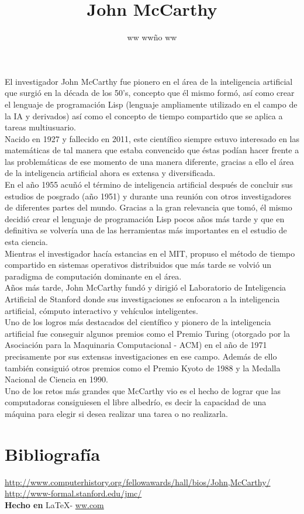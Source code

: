 \documentclass{article}
\title{John McCarthy}
\author{ww ww\~no ww}
\date{} %
\begin{document}
	\maketitle
	\normalsize{
El investigador John McCarthy fue pionero en el área de la inteligencia artificial que surgió en la década de los 50's, concepto que él mismo formó, así como crear el lenguaje de programación Lisp (lenguaje ampliamente utilizado en el campo de la IA y derivados) así como el concepto de tiempo compartido que se aplica a tareas multiusuario.
\\

Nacido en 1927 y fallecido en 2011, este científico siempre estuvo interesado en las matemáticas de tal manera que estaba convencido que éstas podían hacer frente a las problemáticas de ese momento de una manera diferente, gracias a ello el área de la inteligencia artificial ahora es extensa y diversificada.
\\

En el año 1955 acuñó el término de inteligencia artificial después de concluir sus estudios de posgrado (año 1951) y durante una reunión con otros investigadores de diferentes partes del mundo. Gracias a la gran relevancia que tomó, él mismo decidió crear el lenguaje de programación Lisp pocos años más tarde y que en definitiva se volvería una de las herramientas más importantes en el estudio de esta ciencia.
\\

Mientras el investigador hacía estancias en el MIT, propuso el método de tiempo compartido en sistemas operativos distribuidos que más tarde se volvió un paradigma de computación dominante en el área.
\\

Años más tarde, John McCarthy fundó y dirigió el Laboratorio de Inteligencia Artificial de Stanford donde sus investigaciones se enfocaron a la inteligencia artificial, cómputo interactivo y vehículos inteligentes.
\\

Uno de los logros más destacados del científico y pionero de la inteligencia artificial fue conseguir algunos premios como el Premio Turing (otorgado por la Asociación para la Maquinaria Computacional - ACM) en el año de 1971 precisamente por sus extensas investigaciones en ese campo. Además de ello también consiguió otros premios como el Premio Kyoto de 1988 y la Medalla Nacional de Ciencia en 1990.
\\

Uno de los retos más grandes que McCarthy vio es el hecho de lograr que las computadoras consiguiesen el libre albedrío, es decir la capacidad de una máquina para elegir si desea realizar una tarea o no realizarla.

}

\vspace{1cm}

\section*{Bibliograf\'ia}

\noindent \url{http://www.computerhistory.org/fellowawards/hall/bios/John,McCarthy/}
\\
\noindent \url{http://www-formal.stanford.edu/jmc/}
\\

\large{\hfill \textbf{Hecho en } \LaTeX - \url{ww.com}}
\end{document}
